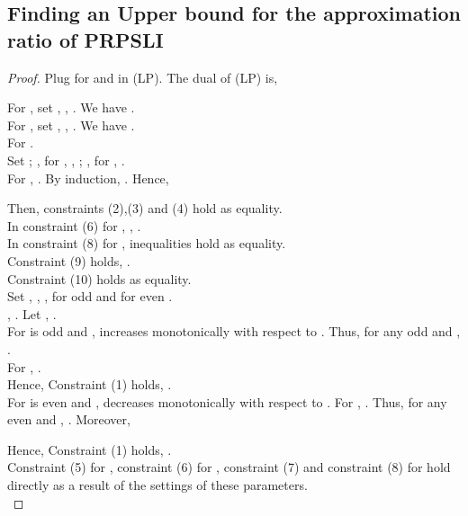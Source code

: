 \documentclass[runningheads,a4paper]{llncs}
\numberwithin{equation}{section}
\begin{document}
\subsection{Finding an Upper bound for the approximation ratio of PRPSLI}

\begin{proof}

Plug  for  and  in (LP). The dual of (LP) is,







For , set , , . We have . \\

For , set , , . We have . \\

For .\\

Set ; ,  for , , ; ,  for , . \\

For , . By induction, . Hence,


Then, constraints (2),(3) and (4) hold as equality. \\

In constraint (6) for , , . \\

In constraint (8) for , inequalities hold as equality. \\

Constraint (9) holds, . \\

Constraint (10) holds as equality. \\

Set , , ,  for odd  and  for even . \\

, . Let , . \\


For  is odd and ,  increases monotonically with respect to . Thus, for any odd  and ,  .\\
For , . \\

Hence, Constraint (1) holds, . \\

For  is even and ,  decreases monotonically with respect to .
For , . Thus, for any even  and , . Moreover, 

Hence, Constraint (1) holds, . \\

Constraint (5) for , constraint (6) for , constraint (7) and constraint (8) for  hold directly as a result of the settings of these parameters. \\


\end{proof}
\end{document}

